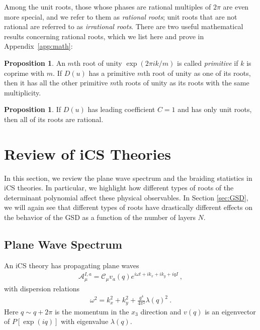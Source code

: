 \documentclass[aps,prb,twocolumn,superscriptaddress,floatfix,10pt,nofootinbib]{revtex4-2}
\newcommand{\ie}{\begin{equation}\begin{aligned}}
\newcommand{\fe}{\end{aligned}\end{equation}}
\theoremstyle{definition}
\newtheorem{proposition}[definition]{Proposition}
\begin{document}
Among the unit roots, those whose phases are rational multiples of $2\pi$ are even more special, and we refer to them as \emph{rational roots}; unit roots that are not rational are referred to as \emph{irrational roots}. There are two useful mathematical results concerning rational roots, which we list here and prove in  Appendix~\ref{app:math}:
\begin{proposition}\label{prop:primitive_roots}
    An $m$th root of unity $\exp(2\pi i k/m)$ is called \textit{primitive} if $k$ is coprime with $m$. If $D(u)$ has a primitive $m$th root of unity as one of its roots, then it has all the other primitive $m$th roots of unity as its roots with the same multiplicity.
\end{proposition}
\begin{proposition}\label{prop:all_rational}
    If $D(u)$ has leading coefficient $C=1$ and has only unit roots, then all of its roots are rational.
\end{proposition}

\section{Review of iCS Theories}\label{sec:review}

In this section, we review the plane wave spectrum \cite{Ma:2020svo,Sullivan:2021rbk,Chen:2022hbz} and the braiding statistics \cite{Ma:2020svo,Chen:2022hbz} in iCS theories. In particular, we highlight how different types of roots of the determinant polynomial affect these physical observables. In Section \ref{sec:GSD}, we will again see that different types of roots have drastically different effects on the behavior of the GSD as a function of the number of layers $N$.


\subsection{Plane Wave Spectrum}
An iCS theory has propagating plane waves 
\ie
\mathcal{A}_\mu^{I,a}=\mathcal{C}_{\mu}v_a(q)e^{i\omega t+ik_x+ik_y+iqI}~,
\fe
with dispersion relations 
\ie
\omega^2=k_x^2+k_y^2+\frac{g^4}{4\pi^2}\lambda(q)^2~.
\fe
Here $q\sim q+2\pi$ is the momentum in the $x_3$ direction and $v(q)$ is an eigenvector of $P[\exp(iq)]$ with eigenvalue $\lambda(q)$. 
\end{document}
